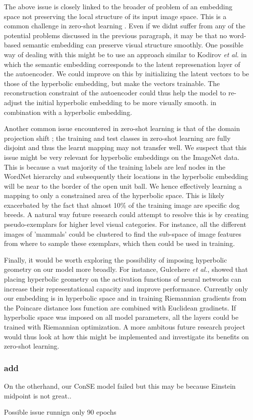 \documentclass[12pt]{report}
\begin{document}
The above issue is closely linked to the broader of problem of an embedding space not preserving the local structure of its input image space. This is a common challenge in zero-shot learning \cite{Ji2017}. Even if we didnt suffer from any of the potential problems discussed in the previous paragraph, it may be that no word-based semantic embedding can preserve visual structure smoothly. One possible way of dealing with this might be to use an approach similar to Kodirov \textit{et al.} \cite{Kodirov2017} in which the semantic embedding corresponds to the latent represenation layer of the autoencoder. We could improve on this by initializing the latent vectors to be those of the hyperbolic embedding, but make the vectors trainable. The reconstruction constraint of the autoencoder could thus help the model to re-adjust the initial hyperbolic embedding to be more visually smooth.
in combination with a hyperbolic embedding. 

Another common issue encountered in zero-shot learning is that of the domain projection shift \cite{Fu2015}; the training and test classes in zero-shot learning are fully disjoint and thus the learnt mapping may not transfer well. We suspect that this issue might be very relevant for hyperbolic embeddings on the ImageNet data. This is because a vast majority of the training labels are leaf nodes in the WordNet hierarchy and subsequently their locations in the hyperbolic embedding will be near to the border of the open unit ball. We hence effectively learning a mapping to only a constrained area of the hyperbolic space. This is likely exacerbated by the fact that almost 10\% \cite{Peterson2018} of the training image are specific dog breeds. A natural way future research could attempt to resolve this is by creating pseudo-exemplars for higher level visual categories. For instance, all the different images of 'mammals' could be clustered to find the sub-space of image features from where to sample these exemplars, which then could be used in training.

Finally, it would be worth exploring the possibility of imposing hyperbolic geometry on our model more broadly. For instance, Gulcehere \textit{et al.}, showed that placing hyperbolic geometry on the activation functions of neural networks can increase their representational capacity and improve performance. Currently only our embedding is in hyperbolic space and in training Riemannian gradients from the Poincare distance loss function are combined with Euclidean gradinets. If hyperbolic space was imposed on all model parameters, all the layers could be trained with Riemannian optimization. A more ambitous future research project would thus look at how this might be implemented and investigate its benefits on zero-shot learning.



\subsubsection{add}

On the otherhand, our ConSE model failed but this may be because Einstein midpoint is not great..

Possible issue runnign only 90 epochs



\end{document}
